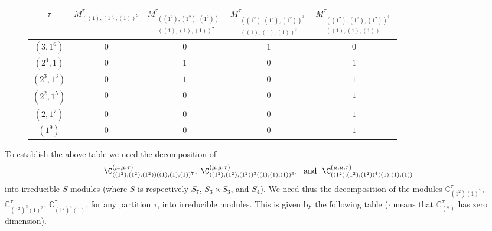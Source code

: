 	\begin{figure} 
			\centering
			\begin{tabular}{|c|c|c|c|c|}
				\hline		
							$\tau$ &$M_{((1),(1),(1))^9}^\tau$ 
				& $M_{\substack{((1^2),(1^2),(1^2))\\ ((1),(1),(1))^7}}^\tau$ 
				&$M_{\substack{((1^2),(1^2),(1^2))^3\\ ((1),(1),(1))^3}}^\tau$
				&$M_{\substack{((1^2),(1^2),(1^2))^4\\ ((1),(1),(1)) }}^\tau$\\ \hline	
				$(3,1^6)$ & $0$ &$0$&$1$&$0$\\ \hline
				$(2^4,1)$ & $0$ &$1$&$0$&$1$\\ \hline
				$(2^3,1^3)$ & $0$ &$1$&$0$&$1$\\ \hline
				$(2^2,1^5)$ & $0$ &$0$&$0$&$1$\\ \hline
				$(2,1^7)$ & $0$ &$0$&$0$ &$1$\\ \hline
				$(1^9)$ & $0$ &$0$&$0$ &$1$ \\ \hline
			\end{tabular}
\end{figure}


To establish the above table we need the decomposition of  
$$
\C_{((1^2),(1^2),(1^2))((1),(1),(1))^7}^{(\mu,\mu,\tau)},\hspace{.1cm}\C_{((1^2),(1^2),(1^2))^3((1),(1),(1))^3}^{(\mu,\mu,\tau)},\hspace{.1cm}\text{ and }\hspace{.1cm}\C_{((1^2),(1^2),(1^2))^4((1),(1),(1))}^{(\mu,\mu,\tau)}
$$
into irreducible $S$-modules (where $S$ is respectively $S_7$, $S_3\times S_3$, and $S_4$). We need thus the decomposition of the modules   $\mathbb{C}_{(1^2)(1)^7}^\tau$, $\mathbb{C}_{(1^2)^3(1)^3}^\tau$, $\mathbb{C}_{(1^2)^4(1)}^\tau$, for any partition $\tau$,  into irreducible modules. This is given by the following table ($\cdot$ means that $\mathbb{C}_{(*)}^\tau$ has zero dimension). 

